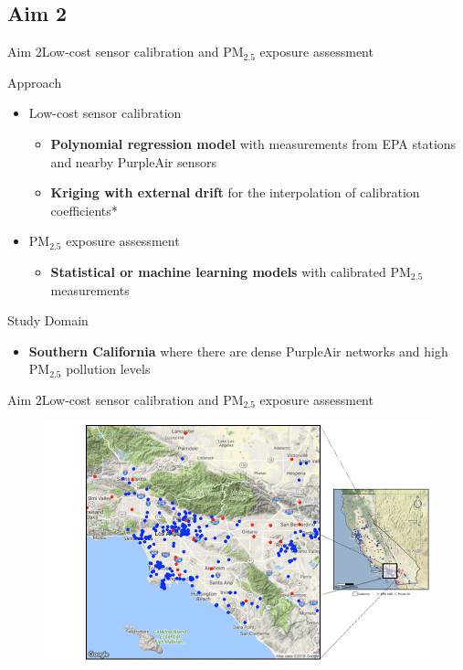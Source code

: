 \documentclass[handout]{beamer} %
\begin{document}
\subsection{Aim 2}
\begin{frame}{Aim 2}{Low-cost sensor calibration and PM$_{2.5}$ exposure assessment}
    \begin{block}{Approach}
        \begin{itemize}
            \item Low-cost sensor calibration
                \begin{itemize}
                    \item \textbf{Polynomial regression model} with measurements from EPA stations and nearby PurpleAir sensors
                    \item \textbf{Kriging with external drift} for the interpolation of calibration coefficients*
                \end{itemize}
            \pause
            \item PM$_{2.5}$ exposure assessment
                \begin{itemize}
                    \item \textbf{Statistical or machine learning models} with calibrated PM$_{2.5}$ measurements
                \end{itemize}
        \end{itemize}
    \end{block}
    \pause
    \begin{block}{Study Domain}
        \begin{itemize}
            \item \textbf{Southern California} where there are dense PurpleAir networks and high PM$_{2.5}$ pollution levels
        \end{itemize}
        
    \end{block}
\end{frame}

\begin{frame}{Aim 2}{Low-cost sensor calibration and PM$_{2.5}$ exposure assessment}
    \begin{figure}
        \centering
        \includegraphics[height=0.55\textwidth]{img/socal.jpg}
        \label{fig:aim2}
    \end{figure}
\end{frame}
\end{document}
